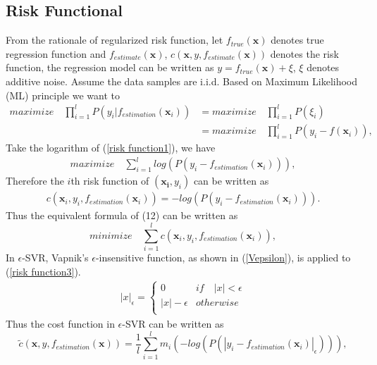 \documentclass[12pt, draftclsnofoot, onecolumn]{IEEEtran}
\begin{document}
\begin{spacing}{2}
\subsection{Risk Functional}\label{risk functional}
From the rationale of regularized risk function, let $f_{true}(\mathbf{x})$ denotes true regression function and $f_{estimate}(\mathbf{x})$, $c(\mathbf{x},y,f_{estimate}(\mathbf{x}))$ denotes the risk function, the regression model can be written as $y=f_{true}(\mathbf{x})+\xi$, $\xi$ denotes additive noise. Assume the data samples are i.i.d. Based on Maximum Likelihood (ML) principle we want to  
\begin{eqnarray}
\nonumber
maximize\quad \prod_{i=1}^{l}P(y_{i}|f_{estimation}(\mathbf{x}_{i}))&=maximize\quad \prod_{i=1}^{l}P(\xi_{i})\\
&=maximize\quad \prod_{i=1}^{l}P(y_{i}-f(\mathbf{x}_{i})),
\label{risk function1}
\end{eqnarray}
Take the logarithm of (\ref{risk function1}), we have
\begin{eqnarray}
maximize\quad \sum_{i=1}^{l}log(P(y_{i}-f_{estimation}(\mathbf{x}_{i}))),
\label{risk function2}
\end{eqnarray}
Therefore the $i$th risk function of $(\mathbf{x_{i}}, y_{i})$ can be written as 
\begin{eqnarray}
c(\mathbf{x}_{i}, y_{i}, f_{estimation}(\mathbf{x}_{i}))=-log(P(y_{i}-f_{estimation}(\mathbf{x}_{i}))).
\label{risk function3}
\end{eqnarray}
Thus the equivalent formula of (12) can be written as 
\begin{equation}
minimize\quad  \sum_{i=1}^{l}c(\mathbf{x}_{i}, y_{i}, f_{estimation}(\mathbf{x}_{i})),
\label{Total risk function}
\end{equation} 
In $\epsilon$-SVR, Vapnik's $\epsilon$-insensitive function, as shown in (\ref{Vepsilon}), is applied to (\ref{risk function3}).
\begin{eqnarray}
|x|_{\epsilon}=\left\{\begin{array}{ll}
0   &if\quad |x|<\epsilon\\
|x|-\epsilon  &otherwise\\
\end{array}\right.
\label{Vepsilon}
\end{eqnarray}
Thus the cost function in $\epsilon$-SVR can be written as 
\begin{equation}
\tilde{c}(\mathbf{x}, y, f_{estimation}(\mathbf{x}))=\frac{1}{l}\sum_{i=1}^{l}m_{i}(-log(P(|y_{i}-f_{estimation}(\mathbf{x}_{i})|_{\epsilon}))),

\end{equation}
\end{spacing}
\end{document}
